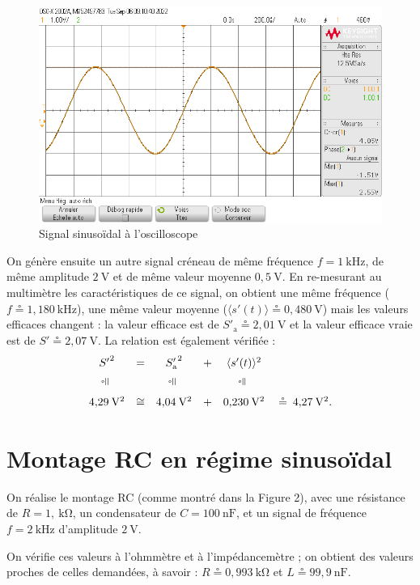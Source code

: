\documentclass[a4paper]{article}
\begin{document}
	\begin{figure}[H]
		\centering
		\includegraphics[scale=0.4]{figures/signal1.png}
		\caption{Signal sinusoïdal à l'oscilloscope}
	\end{figure}
	
	\begin{multicols}{2}
		On génère ensuite un autre signal créneau de même fréquence $f = 1\: \mathrm{kHz}$, de même amplitude $2\:\mathrm{V}$\/ et de même valeur moyenne $0{,}5\:\mathrm{V}$. En re-mesurant au multimètre les caractéristiques de ce signal, on obtient une même fréquence ($f \circeq 1{,}180\:\mathrm{kHz}$), une même valeur moyenne ($\langle s'(t) \rangle \circeq 0{,}480\:\mathrm{V}$) mais les valeurs efficaces changent : la valeur efficace est de $S'_\mathrm{a} \circeq 2{,}01\:\mathrm{V}$\/ et la valeur efficace vraie est de $S' \circeq 2{,}07\:\mathrm{V}$. La relation est également vérifiée : \[
			\begin{array}{cccccr}
				{S'}^2 &=& {S'_\mathrm{a}}^2 &+& \langle s'(t) \rangle^2\\[2mm]
				\vrt\circeq&&\vrt\circeq&&\vrt\circeq\\[2mm]
				4{,}29\:\mathrm{V^2}&\cong&4{,}04\:\mathrm{V^2}&+&0{,}230\:\mathrm{V}^2 &\:\circeq\:4{,}27\:\mathrm{V}^2.
			\end{array}
		\]

		\section{Montage RC en régime sinusoïdal}

		On réalise le montage RC (comme montré dans la {\sc Figure 2}), avec une résistance de $R = 1{,}\:\mathrm{k\Omega}$, un condensateur de $C = 100\:\mathrm{nF}$, et un signal de fréquence $f = 2\:\mathrm{kHz}$\/ d'amplitude $2\:\mathrm{V}$.

		On vérifie ces valeurs à l'ohmmètre et à l'impédancemètre ; on obtient des valeurs proches de celles demandées, à savoir : $R \circeq 0{,}993\:\mathrm{k\Omega}$\/ et $L \circeq 99{,}9\:\mathrm{nF}$.
	\end{multicols}
\end{document}
